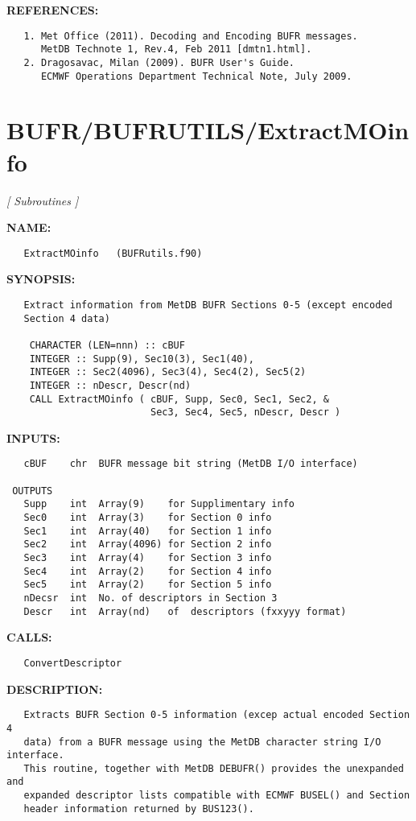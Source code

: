 \textbf{REFERENCES:}\hspace{0.08in}\begin{Verbatim}
   1. Met Office (2011). Decoding and Encoding BUFR messages.
      MetDB Technote 1, Rev.4, Feb 2011 [dmtn1.html].
   2. Dragosavac, Milan (2009). BUFR User's Guide.
      ECMWF Operations Department Technical Note, July 2009.
\end{Verbatim}
\section{BUFR/BUFRUTILS/ExtractMOinfo}
\textsl{[ Subroutines ]}

\label{ch:robo6}
\label{ch:BUFR_BUFRUTILS_ExtractMOinfo}
\textbf{NAME:}\hspace{0.08in}\begin{Verbatim}
   ExtractMOinfo   (BUFRutils.f90)
\end{Verbatim}
\textbf{SYNOPSIS:}\hspace{0.08in}\begin{Verbatim}
   Extract information from MetDB BUFR Sections 0-5 (except encoded
   Section 4 data)

    CHARACTER (LEN=nnn) :: cBUF
    INTEGER :: Supp(9), Sec10(3), Sec1(40),
    INTEGER :: Sec2(4096), Sec3(4), Sec4(2), Sec5(2)
    INTEGER :: nDescr, Descr(nd)
    CALL ExtractMOinfo ( cBUF, Supp, Sec0, Sec1, Sec2, &
                         Sec3, Sec4, Sec5, nDescr, Descr )
\end{Verbatim}
\textbf{INPUTS:}\hspace{0.08in}\begin{Verbatim}
   cBUF    chr  BUFR message bit string (MetDB I/O interface)

 OUTPUTS
   Supp    int  Array(9)    for Supplimentary info
   Sec0    int  Array(3)    for Section 0 info
   Sec1    int  Array(40)   for Section 1 info
   Sec2    int  Array(4096) for Section 2 info
   Sec3    int  Array(4)    for Section 3 info
   Sec4    int  Array(2)    for Section 4 info
   Sec5    int  Array(2)    for Section 5 info
   nDecsr  int  No. of descriptors in Section 3
   Descr   int  Array(nd)   of  descriptors (fxxyyy format)
\end{Verbatim}
\textbf{CALLS:}\hspace{0.08in}\begin{Verbatim}
   ConvertDescriptor
\end{Verbatim}
\textbf{DESCRIPTION:}\hspace{0.08in}\begin{Verbatim}
   Extracts BUFR Section 0-5 information (excep actual encoded Section 4
   data) from a BUFR message using the MetDB character string I/O interface.
   This routine, together with MetDB DEBUFR() provides the unexpanded and
   expanded descriptor lists compatible with ECMWF BUSEL() and Section
   header information returned by BUS123().
\end{Verbatim}
